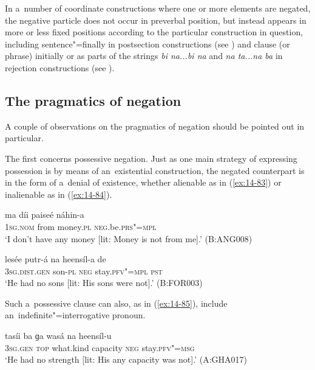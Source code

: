 In a~number of coordinate constructions where one or more elements are negated, the negative particle does not occur in preverbal position, but instead appears in more or less fixed positions according to the particular construction in question, including sentence"=finally in postsection constructions (see ) and clause (or phrase) initially or as parts of the strings \textit{bi na...bi na} and \textit{na ta...na ba} in rejection constructions (see ). 


\subsection{The pragmatics of negation}
\label{subsec:14-3-4}


A couple of observations on the pragmatics of negation should be pointed out in particular.


The first concerns possessive negation. Just as one main strategy of expressing possession is by means of an~existential construction, the negated counterpart is in the form of a~denial of existence, whether alienable as in (\ref{ex:14-83}) or inalienable as in (\ref{ex:14-84}).

\begin{exe}
\ex
\label{ex:14-83}
\gll ma díi paiseé náhin-a \\
\textsc{1sg.nom} from money.\textsc{pl} \textsc{neg}.be.\textsc{prs"=mpl}  \\
\glt `I don't have any money [lit: Money is not from me].' (B:ANG008)

\ex
\label{ex:14-84}
\gll lesée putr-á na heensíl-a de \\
\textsc{3sg.dist.gen} son-\textsc{pl} \textsc{neg} stay.\textsc{pfv"=mpl} \textsc{pst}  \\
\glt `He had no sons [lit: His sons were not].' (B:FOR003)
\end{exe}

Such a~possessive clause can also, as in (\ref{ex:14-85}), include an~indefinite"=interrogative pronoun.

\begin{exe}
\ex
\label{ex:14-85}
\gll tasíi ba ɡa wasá na heensíl-u \\
\textsc{3sg.gen} \textsc{top} what.kind capacity \textsc{neg} stay.\textsc{pfv"=msg } \\
\glt `He had no strength [lit: His any capacity was not].' (A:GHA017)
\end{exe}

